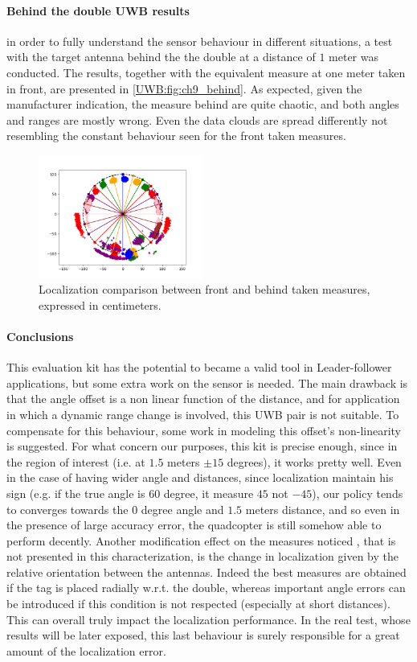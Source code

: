 \paragraph{Behind the double UWB results}
in order to fully understand the sensor behaviour in different situations, a test with the target antenna behind the the double at a distance of $1$ meter was conducted. The results, together with the equivalent measure at one meter taken in front, are presented in \autoref{UWB:fig:ch9_behind}. As expected, given the manufacturer indication, the measure behind are quite chaotic, and both angles and ranges are mostly wrong. Even the data clouds are spread differently not resembling the constant behaviour seen for the front taken measures.

\begin{figure}
    \centering
    \includegraphics[width=0.48\textwidth]{images/ch9_behind_measure.png}
    \caption{Localization comparison between front and behind taken measures, expressed in centimeters.}
    \label{UWB:fig:ch9_behind}
\end{figure}

\paragraph{Conclusions}\label{UWB:conclus}
This evaluation kit has the potential to became a valid tool in Leader-follower applications, but some extra work on the sensor is needed. The main drawback is that the angle offset is a non linear function of the distance, and for application in which a dynamic range change is involved, this UWB pair is not suitable. To compensate for this behaviour, some work in modeling this offset's non-linearity is suggested. For what concern our purposes, this kit is precise enough, since in the region of interest (i.e. at $1.5$ meters $\pm 15$ degrees), it works pretty well. Even in the case of having wider angle and distances, since localization maintain his sign (e.g. if the true angle is $60$ degree, it measure $45$ not $-45$), our policy tends to converges towards the $0$ degree angle and $1.5$ meters distance, and so even in the presence of large accuracy error, the quadcopter is still somehow able to perform decently. Another modification effect on the measures noticed , that is not presented in this characterization, is the change in localization given by the relative orientation between the antennas. Indeed the best measures are obtained if the tag is placed radially w.r.t. the double, whereas important angle errors can be introduced if this condition is not respected (especially at short distances). This can overall truly impact the localization performance. In the real test, whose results will be later exposed, this last behaviour is surely responsible for a great amount of the localization error.